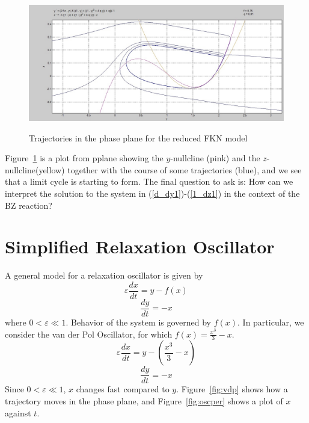 \documentclass[]{article}
\numberwithin{equation}{section}		%
\begin{document}
\begin{figure}
\caption{Trajectories in the phase plane for the reduced FKN model}
\includegraphics[scale=.45]{figures/FKN_figure.jpg}
\label{fig:fkn}
\end{figure}
Figure~\ref{fig:fkn} is a plot from pplane showing the $y$-nullcline (pink) and the $z$-nullcline(yellow) together with the course of some trajectories (blue), and we see that a limit cycle is starting to form. The final question to ask is: How can we interpret the solution to the system in (\ref{d_dy1})-(\ref{1_dz1}) in the context of the BZ reaction?

\section{Simplified Relaxation Oscillator}
A general model for a relaxation oscillator is given by
\begin{equation}\label{rox}
\varepsilon\frac{dx}{dt}=y-f(x)
\end{equation}
\begin{equation}\label{roy}
\frac{dy}{dt}=-x
\end{equation}
where $0<\varepsilon\ll 1$. Behavior of the system is governed by $f(x)$. In particular, we consider the van der Pol Oscillator, for which $f(x)=\frac{x^3}{3}-x$.
\newpage
\begin{equation}\label{fdpx}
\varepsilon\frac{dx}{dt}=y-\left( \frac{x^3}{3}-x\right) 
\end{equation}
\begin{equation}\label{fdpy}
\frac{dy}{dt}=-x
\end{equation}
Since $0<\varepsilon\ll 1$, $x$ changes fast compared to $y$. Figure~\ref{fig:vdp} shows how a trajectory moves in the phase plane, and Figure~\ref{fig:oscper} shows a plot of $x$ against $t$. 
\end{document}
